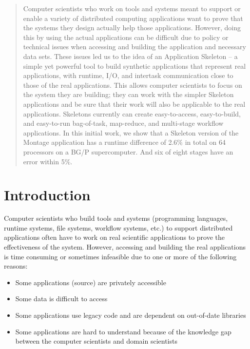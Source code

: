 \documentclass{sig-alternate}
\newenvironment{shortlist}{
        \vspace*{-0.5em}
  \begin{itemize}
  \setlength{\itemsep}{-0.1em}
}{
  \end{itemize}
        \vspace*{-0.5em}
}
\begin{document}
\maketitle

\begin{abstract}
Computer scientists who work on tools and systems meant to
support or enable a variety of distributed computing applications want to
prove that the systems they design actually help those applications.
However, doing this by using the actual applications can be
difficult due to policy or technical issues when accessing and building the application
and necessary data sets.  
These issues led us to the idea of an Application Skeleton -- a simple yet powerful tool to build synthetic applications that represent
real applications, with runtime, I/O, and intertask communication close to those of
the real applications. This allows computer scientists to focus on the system they are
building; they can work with the simpler Skeleton applications and be sure that their
work will also be applicable to the real applications.
Skeletons currently can create easy-to-access, easy-to-build,
and easy-to-run bag-of-task, map-reduce,
and multi-stage workflow applications. In this initial work, we show that a Skeleton
version of the Montage application has a runtime 
difference of 2.6\% in total on 64 processors on a BG/P supercomputer. And six of
eight stages have an error within 5\%.

\end{abstract}

   \lstset{
     basicstyle=\ttfamily\scriptsize,
     breaklines=true
   }

\section{Introduction}
Computer scientists who build tools and systems (programming languages, runtime systems, file systems, workflow systems, etc.) 
to support distributed applications often have to work on real scientific applications to prove the effectiveness of
the system. However, accessing and building the real applications is time consuming or sometimes infeasible due to one
or more of the following reasons:
\begin{shortlist}
\item {} Some applications (source) are privately accessible
\item {} Some data is difficult to access 
\item {} Some applications use legacy code and are dependent on out-of-date libraries
\item {} Some applications are hard to understand because of the knowledge gap between the computer scientists and domain scientists
\end{shortlist}
\end{document}
